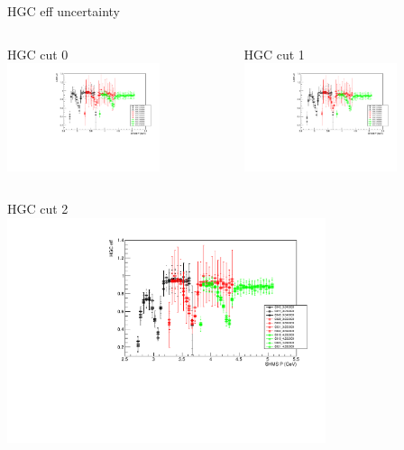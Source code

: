 \documentclass[aspectratio=169,xcolor=dvipsnames]{beamer}
\begin{document}
\begin{frame}{HGC eff uncertainty}
    \begin{columns}
    \begin{column}[T]{0.5\textwidth}
    HGC cut 0 \\
    \includegraphics[width = 0.7\textwidth]{results/pid/hgcer/x_Q2_0.35_4.00_0_shmsp.pdf}
    \end{column}
     \begin{column}[T]{0.5\textwidth}
     HGC cut 1 \\
     \includegraphics[width = 0.7\textwidth]{results/pid/hgcer/x_Q2_0.35_4.00_1_shmsp.pdf}
    \end{column}
    \end{columns}
     \begin{columns}
    \begin{column}[T]{0.5\textwidth}
    HGC cut 2 \\
    \includegraphics[width = 0.7\textwidth]{results/pid/hgcer/x_Q2_0.35_4.00_2_shmsp.pdf}

\end{column}
\end{columns}
\end{frame}
\end{document}
